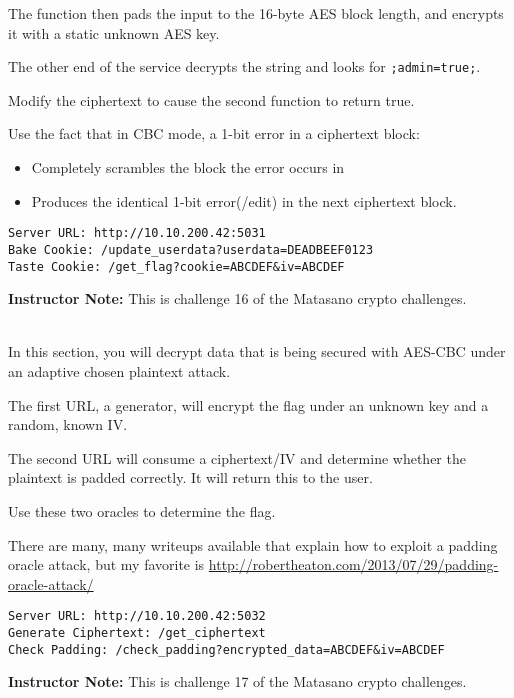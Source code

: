\documentclass[11pt,oneside]{article}
\newcommand{\sectionfont}{phv} %
\renewcommand{\subsection}[1] {
    \vspace{12pt}{\fontfamily{\sectionfont}\selectfont\large\scshape\textbf{#1}}\\[-10pt]

}
\begin{document}
The function then pads the input to the 16-byte AES block length, and encrypts
it with a static unknown AES key.

The other end of the service decrypts the string and looks for
\texttt{;admin=true;}.

Modify the ciphertext to cause the second function to return true.

Use the fact that in CBC mode, a 1-bit error in a ciphertext block:
\begin{itemize}
	\item Completely scrambles the block the error occurs in
	\item Produces the identical 1-bit error(/edit) in the next ciphertext block.
\end{itemize}

\begin{verbatim}
Server URL: http://10.10.200.42:5031
Bake Cookie: /update_userdata?userdata=DEADBEEF0123
Taste Cookie: /get_flag?cookie=ABCDEF&iv=ABCDEF
\end{verbatim}

\ifinstructornotes
\textbf{Instructor Note:} This is challenge 16 of the Matasano crypto
challenges.
\fi

\subsection{Part 2: Padding Oracle Attack}

In this section, you will decrypt data that is being secured with AES-CBC under
an adaptive chosen plaintext attack.

The first URL, a generator, will encrypt the flag under an unknown key and a
random, known IV.

The second URL will consume a ciphertext/IV and determine whether the plaintext
is padded correctly. It will return this to the user.

Use these two oracles to determine the flag.

There are many, many writeups available that explain how to exploit a padding
oracle attack, but my favorite is
\url{http://robertheaton.com/2013/07/29/padding-oracle-attack/}

\begin{verbatim}
Server URL: http://10.10.200.42:5032
Generate Ciphertext: /get_ciphertext
Check Padding: /check_padding?encrypted_data=ABCDEF&iv=ABCDEF
\end{verbatim}

\ifinstructornotes
\textbf{Instructor Note:} This is challenge 17 of the Matasano crypto
challenges.
\fi
\end{document}
